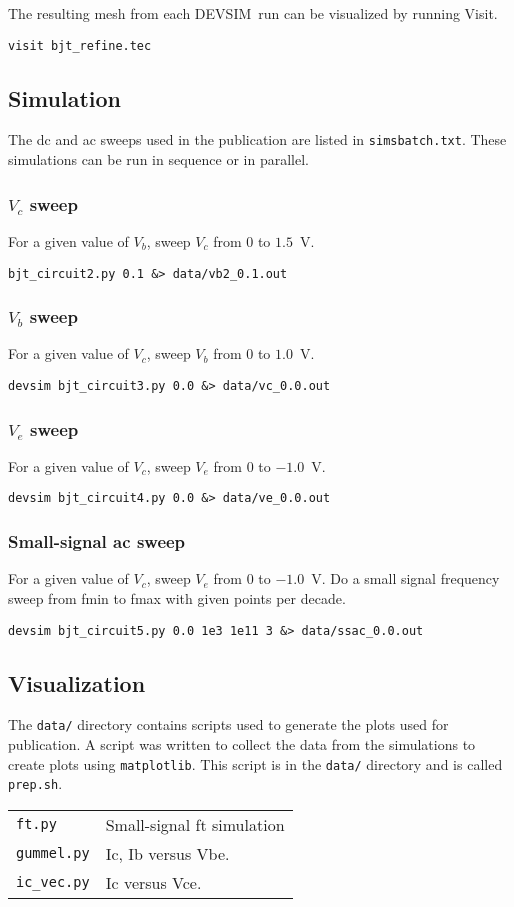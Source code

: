 \documentclass[11pt]{article}
\newcommand{\devsim}{\mbox{DEVSIM}}
\begin{document}
The resulting mesh from each \devsim\ run can be visualized by running Visit.
\begin{verbatim}
visit bjt_refine.tec
\end{verbatim}
\subsection{Simulation}
The dc and ac sweeps used in the publication are listed in \texttt{simsbatch.txt}.  These simulations can be run in sequence or in parallel.

\subsubsection{$V_c$ sweep}
For a given value of $V_b$, sweep $V_c$ from $0$ to $1.5$~V.
\begin{verbatim}
bjt_circuit2.py 0.1 &> data/vb2_0.1.out
\end{verbatim}

\subsubsection{$V_b$ sweep}
For a given value of $V_c$, sweep $V_b$ from $0$ to $1.0$~V.
\begin{verbatim}
devsim bjt_circuit3.py 0.0 &> data/vc_0.0.out
\end{verbatim}

\subsubsection{$V_e$ sweep}
For a given value of $V_c$, sweep $V_e$ from $0$ to $-1.0$~V.
\begin{verbatim}
devsim bjt_circuit4.py 0.0 &> data/ve_0.0.out
\end{verbatim}

\subsubsection{Small-signal ac sweep}
For a given value of $V_c$, sweep $V_e$ from $0$ to $-1.0$~V.  Do a small signal frequency sweep from fmin to fmax with given points per decade.
\begin{verbatim}
devsim bjt_circuit5.py 0.0 1e3 1e11 3 &> data/ssac_0.0.out
\end{verbatim}

\subsection{Visualization}
The \texttt{data/} directory contains scripts used to generate the plots used for publication.  A script was written to collect the data from the simulations to create plots using \texttt{matplotlib}.  This script is in the \texttt{data/} directory and is called \texttt{prep.sh}.

\begin{tabular}{ll}
\texttt{ft.py} & Small-signal ft simulation\\
\texttt{gummel.py} & Ic, Ib versus Vbe.\\
\texttt{ic\_vec.py} & Ic versus Vce.\\
\end{tabular}
\end{document}
